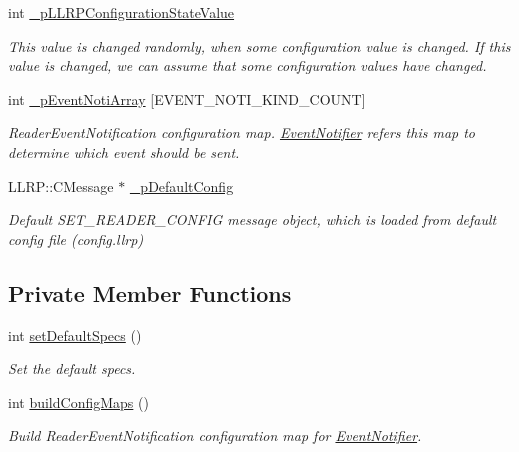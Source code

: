 \begin{DoxyCompactItemize}
\item 
int \hyperlink{class_e_l_f_i_n_1_1_l_l_r_p_reader_config_a5fee5f1463166944eb78a26d2b39858d}{\-\_\-p\-L\-L\-R\-P\-Configuration\-State\-Value}
\begin{DoxyCompactList}\small\item\em This value is changed randomly, when some configuration value is changed. If this value is changed, we can assume that some configuration values have changed. \end{DoxyCompactList}\item 
int \hyperlink{class_e_l_f_i_n_1_1_l_l_r_p_reader_config_ac956371ce5b8c395bdbf5debf4fe9968}{\-\_\-p\-Event\-Noti\-Array} \mbox{[}E\-V\-E\-N\-T\-\_\-\-N\-O\-T\-I\-\_\-\-K\-I\-N\-D\-\_\-\-C\-O\-U\-N\-T\mbox{]}
\begin{DoxyCompactList}\small\item\em Reader\-Event\-Notification configuration map. \hyperlink{class_e_l_f_i_n_1_1_event_notifier}{Event\-Notifier} refers this map to determine which event should be sent. \end{DoxyCompactList}\item 
L\-L\-R\-P\-::\-C\-Message $\ast$ \hyperlink{class_e_l_f_i_n_1_1_l_l_r_p_reader_config_a1ea5b8b04a69ffaf325a7c989c1cf3af}{\-\_\-p\-Default\-Config}
\begin{DoxyCompactList}\small\item\em Default S\-E\-T\-\_\-\-R\-E\-A\-D\-E\-R\-\_\-\-C\-O\-N\-F\-I\-G message object, which is loaded from default config file ({\itshape config.\-llrp}) \end{DoxyCompactList}\end{DoxyCompactItemize}
\subsection*{Private Member Functions}
\begin{DoxyCompactItemize}
\item 
int \hyperlink{class_e_l_f_i_n_1_1_l_l_r_p_reader_config_a694134666941b94248c9a57082252fc1}{set\-Default\-Specs} ()
\begin{DoxyCompactList}\small\item\em Set the default specs. \end{DoxyCompactList}\item 
int \hyperlink{class_e_l_f_i_n_1_1_l_l_r_p_reader_config_a8ecdc94d9c07bf1ede23093618b0f836}{build\-Config\-Maps} ()
\begin{DoxyCompactList}\small\item\em Build Reader\-Event\-Notification configuration map for \hyperlink{class_e_l_f_i_n_1_1_event_notifier}{Event\-Notifier}. \end{DoxyCompactList}\end{DoxyCompactItemize}


